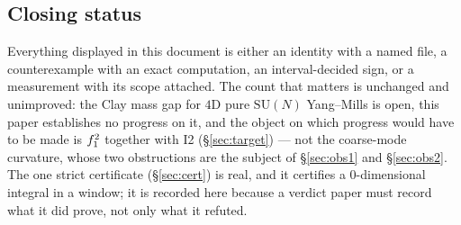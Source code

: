 
\subsection{Closing status}

Everything displayed in this document is either an identity with a named file, a counterexample
with an exact computation, an interval-decided sign, or a measurement with its scope attached. The
count that matters is unchanged and unimproved: the Clay mass gap for $4$D pure $\mathrm{SU}(N)$
Yang--Mills is open, this paper establishes no progress on it, and the object on which progress
would have to be made is $f_1^2$ together with I2 (\S\ref{sec:target}) --- not the coarse-mode
curvature, whose two obstructions are the subject of \S\ref{sec:obs1} and \S\ref{sec:obs2}. The
one strict certificate (\S\ref{sec:cert}) is real, and it certifies a $0$-dimensional integral in a
window; it is recorded here because a verdict paper must record what it did prove, not only what
it refuted.
